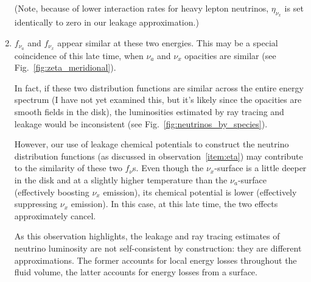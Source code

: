 \begin{enumerate}
    (Note, because of lower interaction rates for heavy lepton neutrinos,
    $\eta_{\nu_x}$ is set identically to zero in our leakage approximation.)
  \item $f_{\nu_a}$ and $f_{\nu_x}$ appear similar at these two energies.
    This may be a special coincidence of this late time, when $\nu_a$ and
    $\nu_x$ opacities are similar (see Fig.~\ref{fig:zeta_meridional}).

    In fact, if these two distribution functions
    are similar across the entire energy spectrum (I have not yet examined this,
    but it's likely since the opacities are smooth fields in the disk),
    the luminosities estimated by ray tracing and leakage would be
    inconsistent (see Fig.~\ref{fig:neutrinos_by_species}).


    However, our use of leakage chemical potentials to construct the neutrino
    distribution functions (as discussed in observation~\ref{item:eta}) may contribute
    to the similarity of these two $f_\nu$s. Even though the $\nu_x$-surface is
    a little deeper in the disk and at a slightly higher temperature than the
    $\nu_a$-surface (effectively boosting $\nu_x$ emission),
    its chemical potential is lower (effectively suppressing $\nu_x$ emission).
    In this case, at this late time, the two effects approximately cancel.

    As this observation highlights, the leakage and ray tracing estimates of
    neutrino luminosity are not self-consistent by construction: they are
    different approximations. The former accounts for local energy losses
    throughout the fluid volume, the latter accounts for energy losses from a
    surface.
\end{enumerate}

